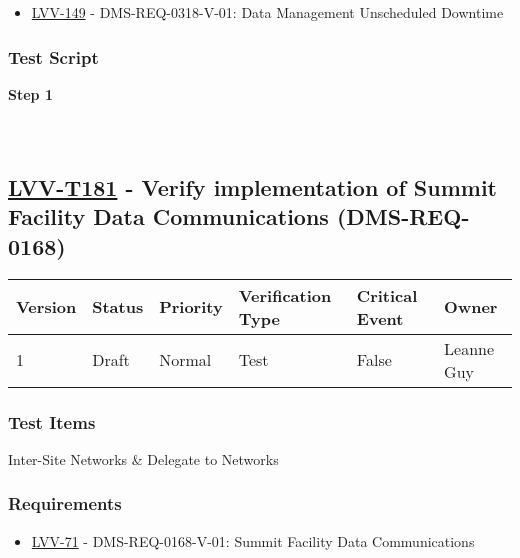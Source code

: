 \begin{itemize}
\tightlist
\item
  \href{https://jira.lsstcorp.org/browse/LVV-149}{LVV-149} -
  DMS-REQ-0318-V-01: Data Management Unscheduled Downtime
\end{itemize}

\hypertarget{test-script-157}{%
\subsubsection{Test Script}\label{test-script-157}}

\textbf{Step 1}\\
~\\
~\\

\hypertarget{lvv-t181---verify-implementation-of-summit-facility-data-communications-dms-req-0168}{%
\subsection{\texorpdfstring{\href{https://jira.lsstcorp.org/secure/Tests.jspa\#/testCase/LVV-T181}{LVV-T181}
- Verify implementation of Summit Facility Data Communications
(DMS-REQ-0168)}{LVV-T181 - Verify implementation of Summit Facility Data Communications (DMS-REQ-0168)}}\label{lvv-t181---verify-implementation-of-summit-facility-data-communications-dms-req-0168}}

\begin{longtable}[]{@{}llllll@{}}
\toprule
Version & Status & Priority & Verification Type & Critical Event &
Owner\tabularnewline
\midrule
\endhead
1 & Draft & Normal & Test & False & Leanne Guy\tabularnewline
\bottomrule
\end{longtable}

\hypertarget{test-items-157}{%
\subsubsection{Test Items}\label{test-items-157}}

Inter-Site Networks \& Delegate to Networks

\hypertarget{requirements-158}{%
\subsubsection{Requirements}\label{requirements-158}}

\begin{itemize}
\tightlist
\item
  \href{https://jira.lsstcorp.org/browse/LVV-71}{LVV-71} -
  DMS-REQ-0168-V-01: Summit Facility Data Communications
\end{itemize}

